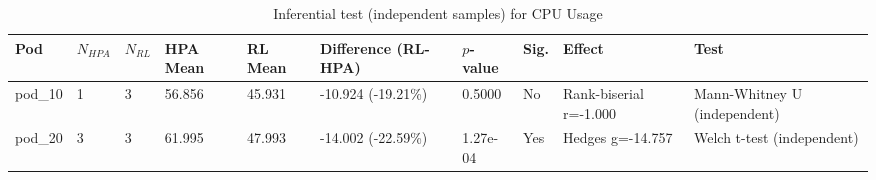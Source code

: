 \begin{table}[ht]
  \centering
  \caption{Inferential test (independent samples) for CPU Usage}\label{tab:inferensial-cpu}
  \begin{tabular}{llllllllll}
    \toprule
    Pod & $N_{HPA}$ & $N_{RL}$ & HPA Mean & RL Mean & Difference (RL-HPA) & $p$-value & Sig. & Effect & Test \\
    \midrule
    pod\_10 & 1 & 3 & 56.856 & 45.931 & -10.924 (-19.21\%) & 0.5000 & No & Rank-biserial r=-1.000 & Mann-Whitney U (independent) \\
    pod\_20 & 3 & 3 & 61.995 & 47.993 & -14.002 (-22.59\%) & 1.27e-04 & Yes & Hedges g=-14.757 & Welch t-test (independent) \\
    \bottomrule
  \end{tabular}
\end{table}